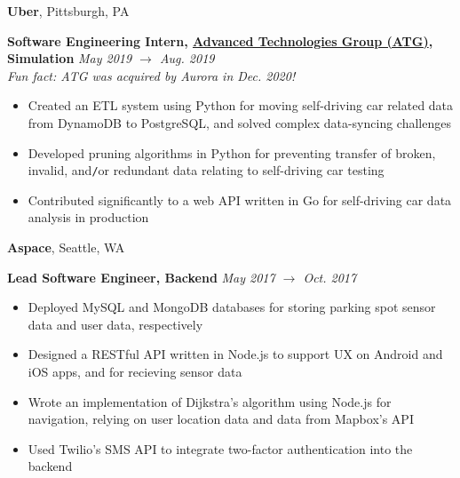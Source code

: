 \documentclass[10pt]{article}
\begin{document}
\begin{flushleft}
		\vspace{-1.50mm}
		\textbf{Uber}, {\small Pittsburgh, PA}\\
		\begin{leftli}
			{\small \textbf{Software Engineering Intern, \href{https://www.uber.com/us/en/atg/research-and-development/perception-and-prediction/}{Advanced Technologies Group (ATG)}, Simulation}} \hfill \textit{\small May 2019 $\rightarrow$ Aug. 2019}\\
			{\footnotesize \textit{Fun fact: ATG was acquired by Aurora in Dec. 2020!}}
			\begin{itemize}
				\item Created an ETL system using Python for moving self-driving car related data from DynamoDB to PostgreSQL, and solved complex data-syncing challenges
				\vspace{-2mm}
				\item Developed pruning algorithms in Python for preventing transfer of broken, invalid, and\texttt{/}or redundant data relating to self-driving car testing
				\vspace{-2mm}
				\item Contributed significantly to a web API written in Go for self-driving car data analysis in production
			\end{itemize}
		\end{leftli}

		\vspace{-1.50mm}
		\textbf{Aspace}, {\small Seattle, WA}\\
		\begin{leftli}
			{\small \textbf{Lead Software Engineer, Backend}} \hfill \textit{\small May 2017 $\rightarrow$ Oct. 2017}

			\begin{itemize}
				\item Deployed MySQL and MongoDB databases for storing parking spot sensor data and user data, respectively
				\vspace{-2mm}
				\item Designed a RESTful API written in Node.js to support UX on Android and iOS apps, and for recieving sensor data
				\vspace{-2mm}
				\item Wrote an implementation of Dijkstra's algorithm using Node.js for navigation, relying on user location data and data from Mapbox's API
				\vspace{-2mm}
				\item Used Twilio's SMS API to integrate two-factor authentication into the backend
			\end{itemize}
		\end{leftli}


\end{flushleft}
\end{document}
